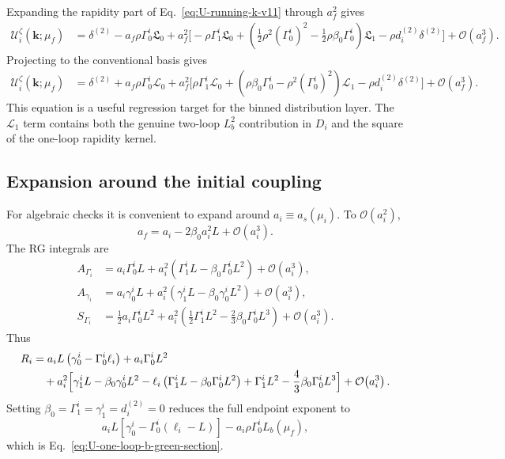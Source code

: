 \documentclass[11pt]{article}
\newcommand{\bk}{\bm{k}}
\newcommand{\deltaT}{\delta^{(2)}}
\newcommand{\order}[1]{\mathcal{O}\!\left(#1\right)}
\begin{document}
Expanding the rapidity part of Eq.~\eqref{eq:U-running-k-v11} through $a_f^2$ gives
\begin{align}
  \mathcal U_i^\zeta(\bk;\mu_f)
  &=\deltaT
  -a_f\rho\Gamma_0^i\mathfrak L_0
  +a_f^2\Bigg[
     -\rho\Gamma_1^i\mathfrak L_0
     +\left(\frac{1}{2}\rho^2(\Gamma_0^i)^2
            -\frac{1}{2}\rho\beta_0\Gamma_0^i\right)\mathfrak L_1
     -\rho d_i^{(2)}\deltaT
   \Bigg]
  +\order{a_f^3}.
  \label{eq:U-zeta-frak-expanded-v11}
\end{align}
Projecting to the conventional basis gives
\begin{align}
  \mathcal U_i^\zeta(\bk;\mu_f)
  &=\deltaT
  +a_f\rho\Gamma_0^i\mathcal L_0
  +a_f^2\Big[
     \rho\Gamma_1^i\mathcal L_0
     +\left(\rho\beta_0\Gamma_0^i-\rho^2(\Gamma_0^i)^2\right)\mathcal L_1
     -\rho d_i^{(2)}\deltaT
   \Big]
  +\order{a_f^3}.
  \label{eq:U-zeta-L-expanded-v11}
\end{align}
This equation is a useful regression target for the binned distribution layer.  The
$\mathcal L_1$ term contains both the genuine two-loop $L_b^2$ contribution in $D_i$ and
the square of the one-loop rapidity kernel.

\subsection{Expansion around the initial coupling}

For algebraic checks it is convenient to expand around $a_i\equiv a_s(\mu_i)$.  To
$\order{a_i^2}$,
\begin{equation}
  a_f=a_i-2\beta_0a_i^2L+\order{a_i^3}.
  \label{eq:af-exp-v11}
\end{equation}
The RG integrals are
\begin{align}
  A_{\Gamma_i}
  &=a_i\Gamma_0^iL
    +a_i^2\left(\Gamma_1^iL-\beta_0\Gamma_0^iL^2\right)
    +\order{a_i^3},
  \label{eq:A-Gamma-exp-v11}
  \\
  A_{\gamma_i}
  &=a_i\gamma_0^iL
    +a_i^2\left(\gamma_1^iL-\beta_0\gamma_0^iL^2\right)
    +\order{a_i^3},
  \label{eq:A-gamma-exp-v11}
  \\
  S_{\Gamma_i}
  &=\frac{1}{2}a_i\Gamma_0^iL^2
    +a_i^2\left(\frac{1}{2}\Gamma_1^iL^2
      -\frac{2}{3}\beta_0\Gamma_0^iL^3\right)
    +\order{a_i^3}.
  \label{eq:S-Gamma-exp-v11}
\end{align}
Thus
\begin{align}
  R_i
  &=a_iL\left(\gamma_0^i-\Gamma_0^i\ell_i\right)
    +a_i\Gamma_0^iL^2
  \notag\\
  &\quad
    +a_i^2\Big[
      \gamma_1^iL-\beta_0\gamma_0^iL^2
      -\ell_i\left(\Gamma_1^iL-\beta_0\Gamma_0^iL^2\right)
      +\Gamma_1^iL^2
      -\frac{4}{3}\beta_0\Gamma_0^iL^3
    \Big]
    +\order{a_i^3}.
  \label{eq:R-exp-v11}
\end{align}
Setting $\beta_0=\Gamma_1^i=\gamma_1^i=d_i^{(2)}=0$ reduces the full endpoint exponent to
\begin{equation}
  a_iL\left[\gamma_0^i-\Gamma_0^i(\ell_i-L)\right]
  -a_i\rho\Gamma_0^iL_b(\mu_f),
  \label{eq:fixed-coupling-reduction-v11}
\end{equation}
which is Eq.~\eqref{eq:U-one-loop-b-green-section}.
\end{document}
